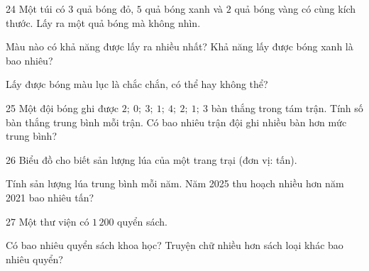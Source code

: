 \gap
\begin{probbox}{24}{\relax}
Một túi có $3$ quả bóng đỏ, $5$ quả bóng xanh và $2$ quả bóng vàng có cùng kích thước. Lấy ra một quả bóng mà không nhìn.\par
{} Màu nào có khả năng được lấy ra nhiều nhất? \quad {} Khả năng lấy được bóng xanh là bao nhiêu?\par
{} Lấy được bóng màu lục là chắc chắn, có thể hay không thể?
\end{probbox}
\gap
\begin{probbox}{25}{\relax}
Một đội bóng ghi được $2;\ 0;\ 3;\ 1;\ 4;\ 2;\ 1;\ 3$ bàn thắng trong tám trận. Tính số bàn thắng trung bình mỗi trận. Có bao nhiêu trận đội ghi nhiều bàn hơn mức trung bình?
\end{probbox}
\gap
\needspace{8.5cm}
\begin{probbox}{26}{\relax}
Biểu đồ cho biết sản lượng lúa của một trang trại (đơn vị: tấn).
\begin{center}
\end{center}
 Tính sản lượng lúa trung bình mỗi năm. \quad {} Năm 2025 thu hoạch nhiều hơn năm 2021 bao nhiêu tấn?
\end{probbox}
\gap
\needspace{7.5cm}
\begin{probbox}{27}{\relax}
Một thư viện có $1\,200$ quyển sách.
\begin{center}
\end{center}
 Có bao nhiêu quyển sách khoa học? \quad {} Truyện chữ nhiều hơn sách loại khác bao nhiêu quyển?
\end{probbox}

